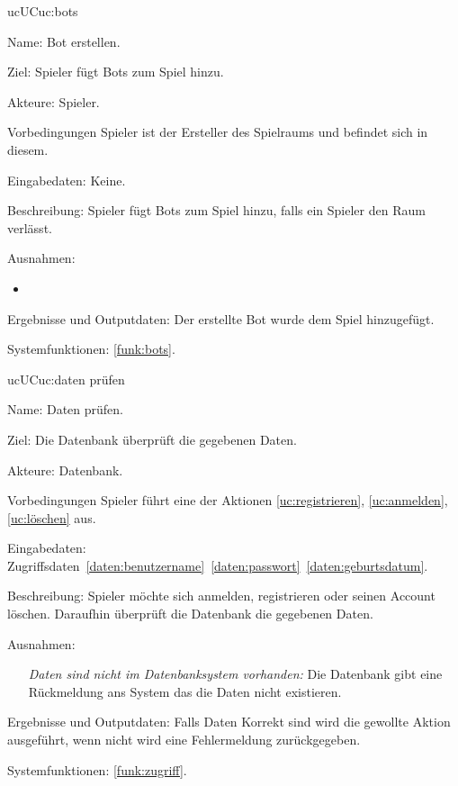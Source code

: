 \begin{description}[leftmargin=5em, style=sameline]
	\begin{lhp}{uc}{UC}{uc:bots}
		\item [Name:] Bot erstellen.
		\item [Ziel:] Spieler fügt Bots zum Spiel hinzu.
		\item [Akteure:] Spieler.
		\item [Vorbedingungen] Spieler ist der Ersteller des Spielraums und befindet sich in diesem.
		\item [Eingabedaten:] Keine.
		\item [Beschreibung:] Spieler fügt Bots zum Spiel hinzu, falls ein Spieler den Raum verlässt.
		\item [Ausnahmen:] \hfill
		\begin{itemize} 
			\item
		\end{itemize}
		\item [Ergebnisse und Outputdaten:] Der erstellte Bot wurde dem Spiel hinzugefügt.	
		\item [Systemfunktionen:] \ref{funk:bots}.
	\end{lhp}
	
	\begin{lhp}{uc}{UC}{uc:daten prüfen}
		\item [Name:] Daten prüfen.
		\item [Ziel:] Die Datenbank überprüft die gegebenen Daten.
		\item [Akteure:] Datenbank.
		\item [Vorbedingungen] Spieler führt eine der Aktionen \ref{uc:registrieren}, \ref{uc:anmelden}, \ref{uc:löschen} aus.
		\item [Eingabedaten:] Zugriffsdaten~\ref{daten:benutzername}~\ref{daten:passwort}~\ref{daten:geburtsdatum}.
		\item [Beschreibung:] Spieler möchte sich anmelden, registrieren oder seinen Account löschen. Daraufhin überprüft die Datenbank die gegebenen Daten.
		\item [Ausnahmen:] \hfill
		\begin{itemize} 
				\item[] \textit{Daten sind nicht im Datenbanksystem vorhanden:} Die Datenbank gibt eine Rückmeldung ans System das die Daten nicht existieren.
				
			\end{itemize}
		\item [Ergebnisse und Outputdaten:] Falls Daten Korrekt sind wird die gewollte Aktion ausgeführt, wenn nicht wird eine Fehlermeldung zurückgegeben.	
		\item [Systemfunktionen:] \ref{funk:zugriff}.
	\end{lhp}



\end{description}